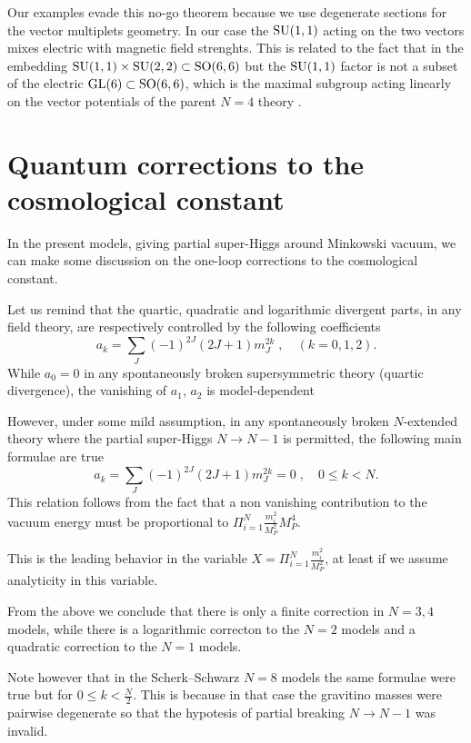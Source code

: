 \documentclass[a4paper,12pt]{article}
\begin{document}
Our examples evade this no-go theorem because we use degenerate sections for the vector multiplets geometry.
In our case the $\mathrm{SU}(1,1)$ acting on the two vectors mixes electric with magnetic field strenghts.
This is related to the fact that in the embedding $\mathrm{SU}(1,1) \times \mathrm{SU}(2,2) \subset \mathrm{SO}(6,6)$ but the $\mathrm{SU}(1,1)$ factor 
is not a subset of the electric
$\mathrm{GL}(6) \subset \mathrm{SO}(6,6)$, which is the maximal subgroup  acting linearly on the vector potentials
 of the parent $N=4$ theory \cite{adfl3, dfv}.


\section{Quantum corrections to the cosmological constant}

In the present models, giving partial super-Higgs around Minkowski vacuum, we can make some discussion on the one-loop 
corrections to the cosmological constant.

Let us remind that the quartic, quadratic and logarithmic divergent parts, in any field theory, are respectively controlled
by the following coefficients \cite{zum,dewitt}
\begin{equation}
a_k = \sum_J (-1)^{2J}(2J+1)m_J^{2k} \; ,\quad (k=0,1,2).
\end{equation}
While $a_0=0$ in any spontaneously broken supersymmetric theory (quartic divergence), the vanishing of $a_1$, $a_2$ is 
model-dependent \cite{zum}

However, under some mild assumption, in any spontaneously broken $N$-extended theory where the partial super-Higgs $N \to N-1$
is permitted, the following main formulae are true
\begin{equation}
a_k = \sum_J (-1)^{2J}(2J+1)m_J^{2k} =0 \; ,\quad 0\leq k<N.
\end{equation}
This relation follows from the fact that a non vanishing contribution to the vacuum energy
 must be proportional to $\Pi_{i=1}^{N} \frac{m_i^2}{M_P^2} M_P^{4}$.

This is the leading behavior in the variable $X=\Pi_{i=1}^{N} \frac{m_i^2}{M_P^2}$, at least if we assume analyticity in this variable.

From  the above we conclude that there is only a finite correction in $N=3,4$ models, while there is a logarithmic correcton to the 
$N=2$ models and a quadratic correction to the $N=1$ models.

Note however that in the Scherk--Schwarz $N=8$ models \cite{ss} the same formulae were true but for $0\leq k<\frac N2$.
This is because in that case the gravitino masses were pairwise degenerate so that the hypotesis of partial breaking $N \to N-1$ was
invalid.
\end{document}
